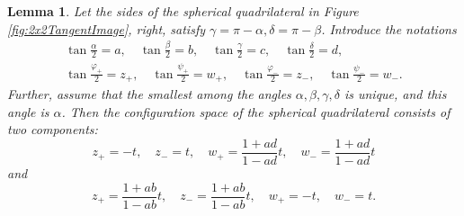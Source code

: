 \documentclass{amsart}
\newtheorem{lem}[thm]{Lemma}
\theoremstyle{definition}
\renewcommand{\phi}{\varphi}
\begin{document}
\begin{lem}
\label{lem:ConfSpace}
Let the sides of the spherical quadrilateral in Figure \ref{fig:2x2TangentImage}, right, satisfy $\gamma = \pi - \alpha, \delta = \pi - \beta$.
Introduce the notations
\begin{gather*}
\tan\frac{\alpha}2 = a, \quad \tan\frac{\beta}2 = b, \quad \tan\frac{\gamma}2 = c, \quad
\tan\frac{\delta}2 = d,\\
\tan\frac{\phi_+}2 = z_+, \quad
\tan\frac{\psi_+}2 = w_+, \quad
\tan\frac{\phi_-}2 = z_-, \quad
\tan\frac{\psi_-}2 = w_-.
\end{gather*}
Further, assume that the smallest among the angles $\alpha, \beta, \gamma, \delta$ is unique, and this angle is $\alpha$.
Then the configuration space of the spherical quadrilateral consists of two components:
\[
z_+ = -t, \quad z_- = t, \quad
w_+ = \frac{1+ad}{1-ad} t, \quad w_- = \frac{1+ad}{1-ad}t
\]
and
\[
z_+ = \frac{1+ab}{1-ab}t, \quad z_- = \frac{1+ab}{1-ab}t, \quad
w_+ = -t, \quad w_- = t.
\]
\end{lem}
\end{document}
